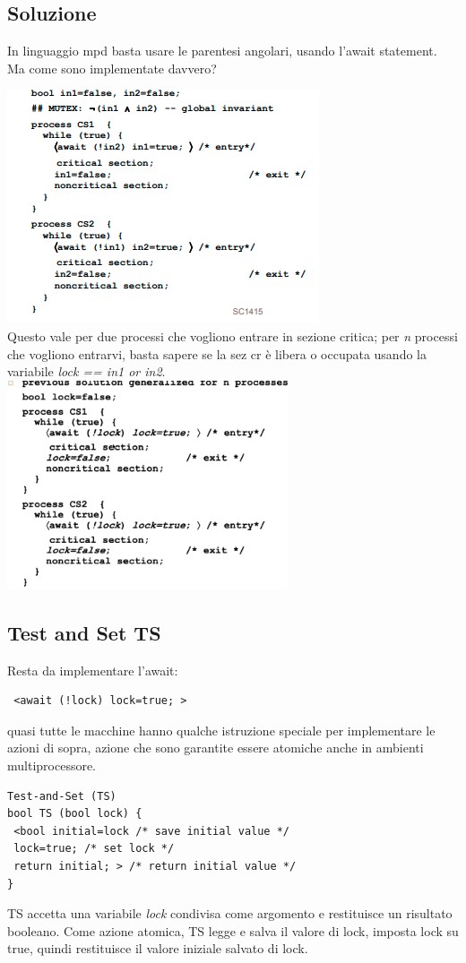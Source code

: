 \documentclass[10pt,a4paper]{book}
\begin{document}
\subsection{Soluzione}
In linguaggio mpd basta usare le parentesi angolari, usando l'await statement. Ma come sono implementate davvero?

\includegraphics[scale=1]{img/cs.png} \\
Questo vale per due processi che vogliono entrare in sezione critica; per \textit{n} processi che vogliono entrarvi, basta sapere se la sez cr è libera o occupata usando la variabile \textit{lock == in1 or in2}.\\

\includegraphics[scale=1]{img/cs2.png} \\

\subsection{Test and Set TS}
Resta da implementare l'await: \begin{verbatim} <await (!lock) lock=true; >\end{verbatim}

quasi tutte le macchine hanno qualche istruzione speciale per implementare le azioni di sopra, azione che sono garantite essere atomiche anche in ambienti multiprocessore.
\begin{verbatim}
Test-and-Set (TS)
bool TS (bool lock) {
 <bool initial=lock /* save initial value */
 lock=true; /* set lock */
 return initial; > /* return initial value */
}
\end{verbatim}
TS accetta una variabile \textit{lock} condivisa come argomento e restituisce un risultato booleano. Come azione atomica, TS legge e salva il valore di lock, imposta lock su true, quindi restituisce il valore iniziale salvato di lock. 
\end{document}
